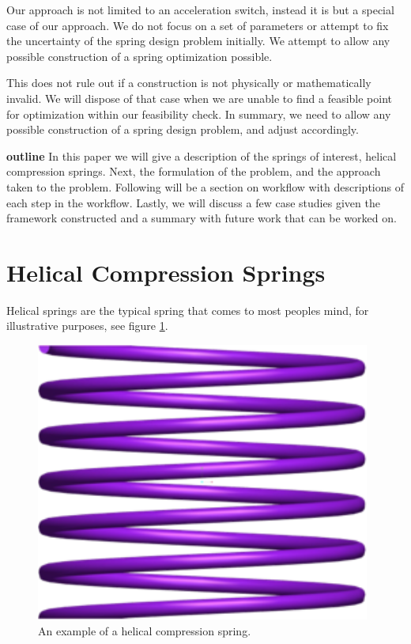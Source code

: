 \documentclass[10pt]{article}
\begin{document}
Our approach is not limited to an acceleration switch, instead it is but a special case of our approach. We do not focus on a set of parameters or attempt to fix the uncertainty of the spring design problem initially. We attempt to allow any possible construction of a spring optimization possible. 

This does not rule out if a construction is not physically or mathematically invalid. We will dispose of that case when we are unable to find a feasible point for optimization within our feasibility check. In summary, we need to allow any possible construction of a spring design problem, and adjust accordingly. 


\textbf{outline}
In this paper we will give a description of the springs of interest, helical compression springs. Next, the formulation of the problem, and the approach taken to the problem. Following will be a section on workflow with descriptions of each step in the workflow. Lastly, we will discuss a few case studies given the framework constructed and a summary with future work that can be worked on.





\section{Helical Compression Springs}

Helical springs are the typical spring that comes to most peoples mind, for illustrative purposes, see figure \ref{Spring}. 

		\begin{figure}[h]
		 \begin{center}\includegraphics[scale=.2]{Spring.png}\end{center}
		 \caption{An example of a helical compression spring.}
		 \label{Spring}
		 
		 \end{figure}
\end{document}
